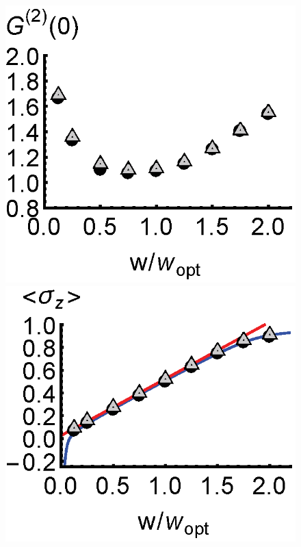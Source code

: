 \documentclass[aps,prl,twocolumn,
superscriptaddress,groupedaddress]{revtex4}
\begin{document}
\begin{figure}
\begin{center}
	\hspace{-5.0mm} \includegraphics[scale =0.38] {N40SuperradianceG2.eps}\\ \vspace{0mm}
	\includegraphics[scale =0.38] {N40CrossoverSZ.eps}

\end{center}
\end{figure}
\end{document}
